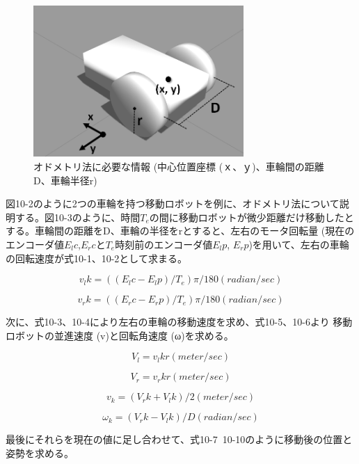\begin{figure}[htp]
  \centering
  \includegraphics[width=8cm]{pictures/chapter10/pic_10_02.png}
  \caption{オドメトリ法に必要な情報 (中心位置座標 (ｘ、ｙ)、車輪間の距離D、車輪半径r)}
\end{figure}

図10-2のように2つの車輪を持つ移動ロボットを例に、オドメトリ法について説明する。図10-3のように、時間$T_e$の間に移動ロボットが微少距離だけ移動したとする。車輪間の距離をD、車輪の半径をrとすると、左右のモータ回転量 (現在のエンコーダ値$E_lc$,$E_rc$と$T_e$時刻前のエンコーダ値$E_lp$, $E_rp$)を用いて、左右の車輪の回転速度が式10-1、10-2として求まる。

\begin{equation}
v_lk = ((E_lc-E_lp)/T_e) π/180     (radian/sec)
\end{equation}

\begin{equation}
v_rk = ((E_rc-E_rp)/T_e)π/180     (radian/sec)
\end{equation}

次に、式10-3、10-4により左右の車輪の移動速度を求め、式10-5、10-6より   移動ロボットの並進速度 (v)と回転角速度 (ω)を求める。

\begin{equation}
V_l = v_lk r     (meter/sec)
\end{equation}

\begin{equation}
V_r = v_rk r     (meter/sec)
\end{equation}

\begin{equation}
v_k = (V_rk+V_lk)/2     (meter/sec)
\end{equation}

\begin{equation}
\omega_k=(V_rk-V_lk)/D     (radian/sec)
\end{equation}

最後にそれらを現在の値に足し合わせて、式10-7~10-10のように移動後の位置と姿勢を求める。

